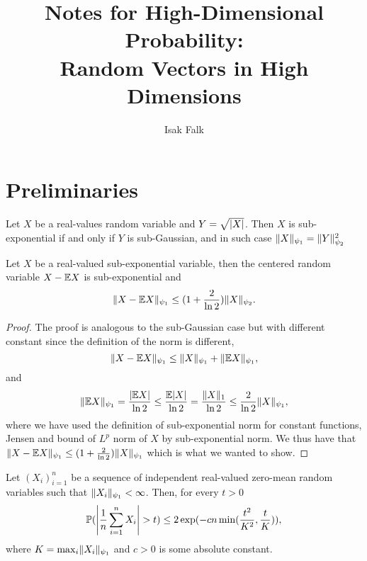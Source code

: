 \documentclass{article}
\title{Notes for High-Dimensional Probability:\\ Random Vectors in High Dimensions}
\author{Isak Falk}
\begin{document}
\maketitle

\section{Preliminaries}

\begin{proposition}
  \label{prop:sub-gauss-sub-exp-norm-relation}
  Let \(X\) be a real-values random variable and \(Y = \sqrt{\abs{X}}\). Then
  \(X\) is sub-exponential if and only if \(Y\) is sub-Gaussian, and in such
  case \(\norm{X}_{\psi_{1}} = \norm{Y}_{\psi_{2}}^{2}\)
\end{proposition}

\begin{proposition}
  \label{prop:centering-of-sub-exp-rvs}
  Let \(X\) be a real-valued sub-exponential variable, then the centered random
  variable \(X - \E X\) is sub-exponential and
  \begin{equation}
    \norm{X - \E X}_{\psi_{1}} \leq (1 + \frac{2}{\ln 2}) \norm{X}_{\psi_{2}}.
  \end{equation}
\end{proposition}

\begin{proof}
  The proof is analogous to the sub-Gaussian case but with different constant
  since the definition of the norm is different,
  \begin{equation}
    \norm{X - \E X}_{\psi_{1}} \leq \norm{X}_{\psi_{1}} + \norm{\E X}_{\psi_{1}},
  \end{equation}
  and
  \begin{equation}
    \norm{\E X}_{\psi_{1}} = \frac{\abs{\E X}}{\ln 2} \leq \frac{\E \abs{X}}{\ln 2} = \frac{\norm{X}_{1}}{\ln 2} \leq \frac{2}{\ln 2}\norm{X}_{\psi_{1}},
  \end{equation}
  where we have used the definition of sub-exponential norm for constant
  functions, Jensen and bound of \(L^{p}\) norm of \(X\) by sub-exponential
  norm. We thus have that
  \(\norm{X - \E X}_{\psi_{1}} \leq (1 + \frac{2}{\ln 2})\norm{X}_{\psi_{1}}\)
  which is what we wanted to show.

\end{proof}

\begin{theorem}
  \label{thm:bernsteins-ineq}
  Let \((X_{i})_{i=1}^{n}\) be a sequence of independent real-valued zero-mean
  random variables such that \(\norm{X_{i}}_{\psi_{1}} < \infty\). Then, for
  every \(t > 0\)
  \begin{equation}
    \Pr(\abs*{\frac{1}{n}\sum_{i=1}^{n}X_{i}} > t) \leq 2\exp(-cn\min(\frac{t^{2}}{K^{2}}, \frac{t}{K})),
  \end{equation}
  where \(K = \max_{i}\norm{X_{i}}_{\psi_{1}}\) and \(c > 0\) is some absolute constant.
\end{theorem}
\end{document}
